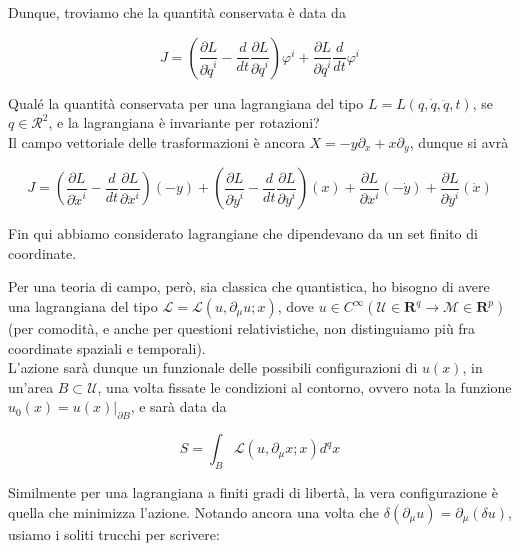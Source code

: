 \documentclass{report}
\begin{document}
Dunque, troviamo che la quantità conservata è data da 

\begin{equation}
    J = \left( \frac{\partial L }{\partial \dot{q}^i}- \frac{d}{dt}\frac{\partial L }{\partial \ddot{q}^i}\right)\varphi^i +  \frac{\partial L }{\partial \ddot{q}^i}\frac{d}{dt}\varphi^i 
\end{equation}

\begin{example}
Qual\'e la quantità conservata per una lagrangiana del tipo $L = L(q, \dot{q}, \ddot{q}, t)$, se $q \in \mathcal{R}^2$, e la lagrangiana è invariante per rotazioni? \\

Il campo vettoriale delle trasformazioni è ancora $X = -y\partial_x + x\partial_y$, dunque si avrà 

\begin{equation}
    J = \left( \frac{\partial L }{\partial \dot{x}^i}- \frac{d}{dt}\frac{\partial L }{\partial \ddot{x}^i}\right)(-y) + \left( \frac{\partial L }{\partial \dot{y}^i}- \frac{d}{dt}\frac{\partial L }{\partial \ddot{y}^i}\right)(x) + \frac{\partial L }{\partial \ddot{x}^i}(-\dot{y}) + \frac{\partial L }{\partial \ddot{y}^i}(\dot{x})
\end{equation}

\end{example}

\newpage

Fin qui abbiamo considerato lagrangiane che dipendevano da un set finito di coordinate.

Per una teoria di campo, però, sia classica che quantistica, ho bisogno di avere una lagrangiana del tipo $\mathcal{L} = \mathcal{L}(u, \partial_{\mu}u; x)$, dove $u \in C^{\infty}(\mathcal{U} \in \mathbf{R}^{q} \rightarrow \mathcal{M} \in \mathbf{R}^p)$ (per comodità, e anche per questioni relativistiche, non distinguiamo più fra coordinate spaziali e temporali). \\[5pt]
L'azione sarà dunque un funzionale delle possibili configurazioni di $u(x)$, in un'area $B \subset \mathcal{U}$, una volta fissate le condizioni al contorno, ovvero nota la funzione $u_0(x) = u(x)|_{\partial B}$, e sarà data da 

\begin{equation}
    S = \int_{B}\mathcal{L}(u, \partial_\mu x; x) d^q x
\end{equation}

Similmente per una lagrangiana a finiti gradi di libertà, la vera configurazione è quella che minimizza l'azione. Notando ancora una volta che $\delta (\partial_\mu u) = \partial_\mu(\delta u)$, usiamo i soliti trucchi per scrivere: 
\end{document}
